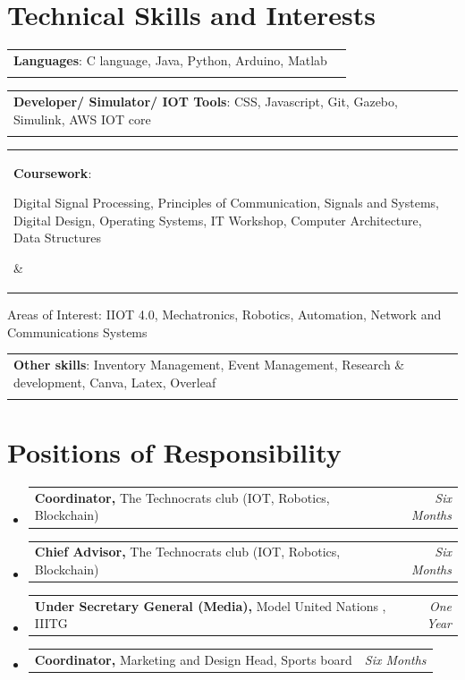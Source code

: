 \documentclass[a4paper,11pt]{article}
\makeatletter
\newcommand{\resumePOR}[3]{
\vspace{0.5mm}\item
    \begin{tabular*}{0.97\textwidth}[t]{l@{\extracolsep{\fill}}r}
        \textbf{#1}\hspace{0.3mm}#2 & \textit{\small{#3}} 
    \end{tabular*}
    \vspace{-2mm}
}
\newcommand{\resumeSubHeadingListStart}{\begin{itemize}[leftmargin=*,labelsep=0mm]}
\newcommand{\resumeSubHeadingListEnd}{\end{itemize}\vspace{2mm}}
\makeatother
\begin{document}
\section{\textbf{\Large Technical Skills and Interests}}
\vspace{-4mm}
 \begin{itemize}[leftmargin=0.05in, label={}]
    \item{
     \resumePOR{Languages}{: C language, Java, Python, Arduino, Matlab } \\
     
     \resumePOR{Developer/ Simulator/ IOT Tools}{: CSS, Javascript, Git, Gazebo, Simulink, AWS IOT core } \\

     \resumePOR{Coursework}{: \parbox[t]{15.5cm}{Digital Signal Processing, Principles of Communication, Signals and Systems, Digital Design, Operating Systems, IT Workshop, Computer Architecture, Data Structures}}

     
     \resumePOR{Areas of Interest}{: IIOT 4.0, Mechatronics, Robotics, Automation, Network and Communications Systems} \\
     
     \resumePOR{Other skills}{: Inventory Management, Event Management, Research \& development, Canva, Latex, Overleaf} \\
    }
 \end{itemize}
 \vspace{-5mm}



\section{\textbf{\Large Positions of Responsibility}}
\vspace{-0.4mm}
\resumeSubHeadingListStart
\resumePOR{Coordinator, } %
    {The Technocrats club (IOT, Robotics, Blockchain)} %
    {Six Months} %
\resumePOR{Chief Advisor, } %
    {The Technocrats club (IOT, Robotics, Blockchain)} %
    {Six Months} %
\resumePOR{Under Secretary General (Media), } %
    {Model United Nations , IIITG} %
    {One Year} %
\resumePOR{Coordinator, } %
    {Marketing and Design Head, Sports board} %
    {Six Months}
\resumeSubHeadingListEnd
\vspace{-5mm}

\end{document}
